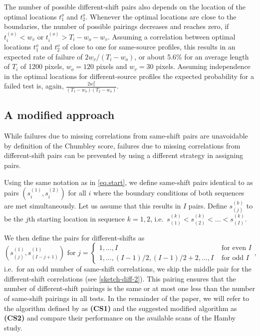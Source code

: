 \documentclass[12pt]{article}
\begin{document}
The number of possible different-shift pairs also depends on the
location of the optimal locations \(t_1^o\) and \(t_2^o\). Whenever the
optimal locations are close to the boundaries, the number of possible
pairings decreases and reaches zero, if \(t_i^{(o)} < w_v\) or
\(t_i^{(o)} > T_i-w_o- w_v\). Assuming a correlation between optimal
locations \(t_1^o\) and \(t_2^o\) of close to one for same-source
profiles, this results in an expected rate of failure of
\(2 w_v / (T_i-w_o)\), or about 5.6\% for an average length of \(T_i\)
of 1200 pixels, \(w_o = 120\) pixels and \(w_v = 30\) pixels. Assuming
independence in the optimal locations for different-source profiles the
expected probability for a failed test is, again,
\(\frac{2 w_v^2}{(T_1-w_o)(T_2-w_o)}\).

\hypertarget{a-modified-approach}{%
\subsection{A modified approach}\label{a-modified-approach}}

While failures due to missing correlations from same-shift pairs are
unavoidable by definition of the Chumbley score, failures due to missing
correlations from different-shift pairs can be prevented by using a
different strategy in assigning pairs.

Using the same notation as in \autoref{eq.start}, we define same-shift
pairs identical to \citet{hadler} as pairs \((s_i^{(1)}, s_i^{(2)})\)
for all \(i\) where the boundary conditions of both sequences are met
simultaneously. Let us assume that this results in \(I\) pairs. Define
\(s_{(j)}^{(k)}\) to be the \(j\)th starting location in sequence
\(k = 1, 2\),
i.e.~\(s_{(1)}^{(k)} < s_{(2)}^{(k)} < ... < s_{(I)}^{(k)}\).

We then define the pairs for different-shifts as
\begin{equation}\label{eq.diff2}
\left(s_{(j)}^{(1)}, s_{(I-j+1)}^{(1)} \right) \text{ for } j = 
\begin{cases}
1, ..., I & \text{ for even } I \\
1, ..., (I-1)/2, (I-1)/2 + 2, ..., I & \text{ for odd } I
\end{cases},
\end{equation} i.e.~for an odd number of same-shift correlations, we
skip the middle pair for the different-shift correlations (see
\autoref{sketch-diff-2}). This pairing ensures that the number of
different-shift pairings is the same or at most one less than the number
of same-shift pairings in all tests. In the remainder of the paper, we
will refer to the algorithm defined by \citet{hadler} as \textbf{(CS1)}
and the suggested modified algorithm as \textbf{(CS2)} and compare their
performance on the available scans of the Hamby study.
\end{document}
